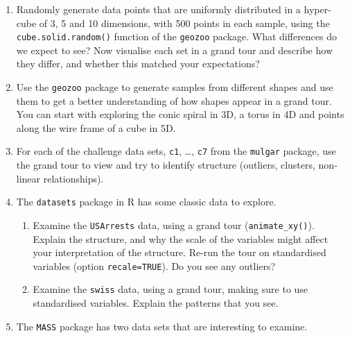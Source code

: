 \documentclass[
  letterpaper,
]{krantz}
\providecommand{\tightlist}{%
  \setlength{\itemsep}{0pt}\setlength{\parskip}{0pt}}\usepackage{longtable,booktabs,array}
\begin{document}

\begin{enumerate}
\def\labelenumi{\arabic{enumi}.}
\tightlist
\item
  Randomly generate data points that are uniformly distributed in a
  hyper-cube of 3, 5 and 10 dimensions, with 500 points in each sample,
  using the \texttt{cube.solid.random()} function of the \texttt{geozoo}
  package. What differences do we expect to see? Now visualise each set
  in a grand tour and describe how they differ, and whether this matched
  your expectations?
\item
  Use the \texttt{geozoo} package to generate samples from different
  shapes and use them to get a better understanding of how shapes appear
  in a grand tour. You can start with exploring the conic spiral in 3D,
  a torus in 4D and points along the wire frame of a cube in 5D.
\item
  For each of the challenge data sets, \texttt{c1}, \ldots, \texttt{c7}
  from the \texttt{mulgar} package, use the grand tour to view and try
  to identify structure (outliers, clusters, non-linear relationships).
\item
  The \texttt{datasets} package in R has some classic data to explore.

  \begin{enumerate}
  \def\labelenumii{\alph{enumii}.}
  \tightlist
  \item
    Examine the \texttt{USArrests} data, using a grand tour
    (\texttt{animate\_xy()}). Explain the structure, and why the scale
    of the variables might affect your interpretation of the structure.
    Re-run the tour on standardised variables (option
    \texttt{recale=TRUE}). Do you see any outliers?
  \item
    Examine the \texttt{swiss} data, using a grand tour, making sure to
    use standardised variables. Explain the patterns that you see.
  \end{enumerate}
\item
  The \texttt{MASS} package has two data sets that are interesting to
  examine.


\end{enumerate}
\end{document}
